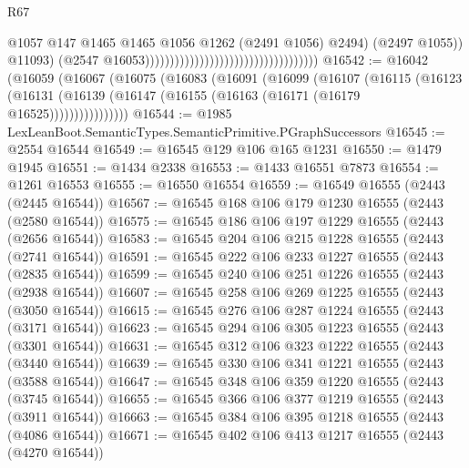 \begin{lexlean}{R67}
\begin{coremodule}
                                                                              @1057
                                                                              @147
                                                                              @1465
                                                                              @1465
                                                                              @1056
                                                                              @1262
                                                                              (@2491 @1056)
                                                                              @2494)
                                                                            (@2497 @1055))
                                                                          @11093)
                                                                        (@2547
                                                                          @16053)))))))))))))))))))))))))))))))))))
@16542 := @16042
    (@16059
      (@16067
        (@16075
          (@16083
            (@16091
              (@16099
                (@16107
                  (@16115
                    (@16123
                      (@16131 (@16139 (@16147 (@16155 (@16163 (@16171 (@16179 @16525))))))))))))))))
@16544 := @1985 LexLeanBoot.SemanticTypes.SemanticPrimitive.PGraphSuccessors
@16545 := @2554 @16544
@16549 := @16545 @129 @106 @165 @1231
@16550 := @1479 @1945
@16551 := @1434 @2338
@16553 := @1433 @16551 @7873
@16554 := @1261 @16553
@16555 := @16550 @16554
@16559 := @16549 @16555 (@2443 (@2445 @16544))
@16567 := @16545 @168 @106 @179 @1230 @16555 (@2443 (@2580 @16544))
@16575 := @16545 @186 @106 @197 @1229 @16555 (@2443 (@2656 @16544))
@16583 := @16545 @204 @106 @215 @1228 @16555 (@2443 (@2741 @16544))
@16591 := @16545 @222 @106 @233 @1227 @16555 (@2443 (@2835 @16544))
@16599 := @16545 @240 @106 @251 @1226 @16555 (@2443 (@2938 @16544))
@16607 := @16545 @258 @106 @269 @1225 @16555 (@2443 (@3050 @16544))
@16615 := @16545 @276 @106 @287 @1224 @16555 (@2443 (@3171 @16544))
@16623 := @16545 @294 @106 @305 @1223 @16555 (@2443 (@3301 @16544))
@16631 := @16545 @312 @106 @323 @1222 @16555 (@2443 (@3440 @16544))
@16639 := @16545 @330 @106 @341 @1221 @16555 (@2443 (@3588 @16544))
@16647 := @16545 @348 @106 @359 @1220 @16555 (@2443 (@3745 @16544))
@16655 := @16545 @366 @106 @377 @1219 @16555 (@2443 (@3911 @16544))
@16663 := @16545 @384 @106 @395 @1218 @16555 (@2443 (@4086 @16544))
@16671 := @16545 @402 @106 @413 @1217 @16555 (@2443 (@4270 @16544))

\end{coremodule}
\end{lexlean}
